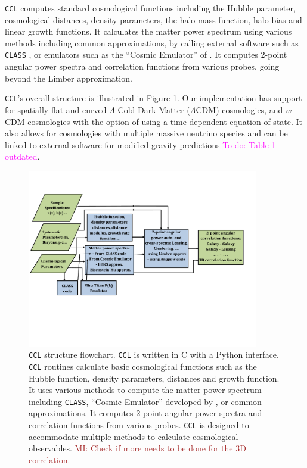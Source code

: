 \documentclass[\docopts]{\docclass}
\newcommand{\todo}[1]{\textcolor{magenta}{To do: #1}}
\newcommand{\mi}[1]{\textcolor{brown}{MI: #1}}
\newcommand{\ccl}{{\tt CCL}\xspace}
\begin{document}
\ccl computes standard cosmological functions including the Hubble parameter, cosmological distances, density parameters, the halo mass function, halo bias and linear growth functions. It calculates the matter power spectrum using various methods including common approximations, by calling external software such as {\tt CLASS} \citep{class}, or emulators such as the ``Cosmic Emulator'' of \citet{Lawrence17}. It computes 2-point angular power spectra and correlation functions from various probes, going beyond the Limber approximation. 

\ccl 's overall structure is illustrated in Figure \ref{fig:CCL_structure}. Our implementation has support for spatially flat and curved $\Lambda$-Cold Dark Matter ($\Lambda$CDM) cosmologies, and $w$CDM cosmologies with the option of using a time-dependent equation of state. It also allows for cosmologies with multiple massive neutrino species and can be linked to external software for modified gravity predictions \citep[{\tt hi$\_$CLASS},][]{Zumalacarregui17} \todo{Table 1 outdated}.

\begin{figure}
\centering
\includegraphics[width=0.9\textwidth]{CCL_Flowchart4}
\caption{\ccl structure flowchart. \ccl is written in C with a Python interface. \ccl routines calculate basic cosmological functions such as the Hubble function, density parameters, distances and growth function. It uses various methods to compute the matter-power spectrum including {\tt CLASS}, ``Cosmic Emulator'' developed by \citet{Lawrence17}, or common approximations. It computes 2-point angular power spectra and correlation functions from various probes. \ccl is designed to accommodate multiple methods to calculate cosmological observables. \mi{Check if more needs to be done for the 3D correlation.}}
\label{fig:CCL_structure}
\end{figure}
\end{document}
